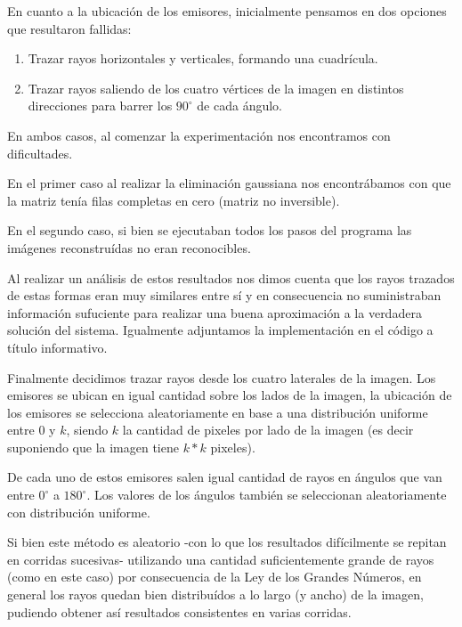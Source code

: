 \par En cuanto a la ubicación de los emisores, inicialmente pensamos en dos opciones que resultaron fallidas:
\begin{enumerate}
\item Trazar rayos horizontales y verticales, formando una cuadrícula.
\item Trazar rayos saliendo de los cuatro vértices de la imagen en distintos direcciones para barrer los $90^{\circ}$ de cada ángulo.
\end{enumerate}

\par En ambos casos, al comenzar la experimentación nos encontramos con dificultades.

\par En el primer caso al realizar la eliminación gaussiana nos encontrábamos con que la matriz tenía filas completas en cero (matriz no inversible).

\par En el segundo caso, si bien se ejecutaban todos los pasos del programa las imágenes reconstruídas no eran reconocibles.

Al realizar un análisis de estos resultados nos dimos cuenta que los rayos trazados de estas formas eran muy similares entre sí y en consecuencia no suministraban información sufuciente para realizar una buena aproximación a la verdadera solución del sistema. Igualmente adjuntamos la implementación en el código a título informativo.

\par Finalmente decidimos trazar rayos desde los cuatro laterales de la imagen. Los emisores se ubican en igual cantidad sobre los lados de la imagen, la ubicación de los emisores se selecciona aleatoriamente en base a una distribución uniforme entre $0$ y $k$, siendo $k$ la cantidad de pixeles por lado de la imagen (es decir suponiendo que la imagen tiene $k*k$ pixeles).

\par De cada uno de estos emisores salen igual cantidad de rayos en ángulos que van entre $0^{\circ}$ a $180^{\circ}$. Los valores de los ángulos también se seleccionan aleatoriamente con distribución uniforme.

\par Si bien este método es aleatorio -con lo que los resultados difícilmente se repitan en corridas sucesivas- utilizando una cantidad suficientemente grande de rayos (como en este caso) por consecuencia de la Ley de los Grandes Números, en general los rayos quedan bien distribuídos a lo largo (y ancho) de la imagen, pudiendo obtener así resultados consistentes en varias corridas.

